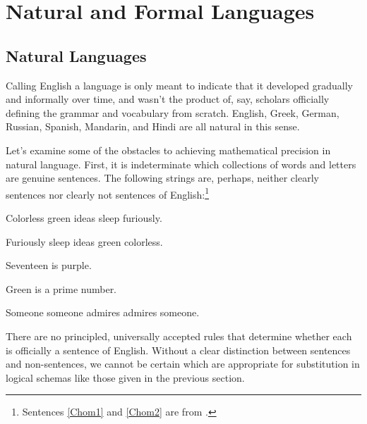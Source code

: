 \section{Natural and Formal Languages}\label{Preliminaries}
\subsection{Natural Languages}\label{Natural Languages}

Calling English a  language is only meant to indicate that it developed gradually and informally over time, and wasn't the product of, say, scholars officially defining the grammar and vocabulary from scratch. 
English, Greek, German, Russian, Spanish, Mandarin, and Hindi are all natural in this sense. 

Let's examine some of the obstacles to achieving mathematical precision in natural language. 
First, it is indeterminate which collections of words and letters are genuine sentences. 
The following strings are, perhaps, neither clearly sentences nor clearly not sentences of English:\footnote{Sentences \ref{Chom1} and \ref{Chom2} are from \citealp{Chomsky1957}.}
\begin{menumerate}
\item\label{Chom1} Colorless green ideas sleep furiously. 
\item\label{Chom2} Furiously sleep ideas green colorless. 
\item Seventeen is purple.
\item Green is a prime number.
\item Someone someone admires admires someone.
\end{menumerate}
There are no principled, universally accepted rules that determine whether each is officially a sentence of English. 
Without a clear distinction between sentences and non-sentences, we cannot be certain which are appropriate for substitution in logical schemas like those given in the previous section.

